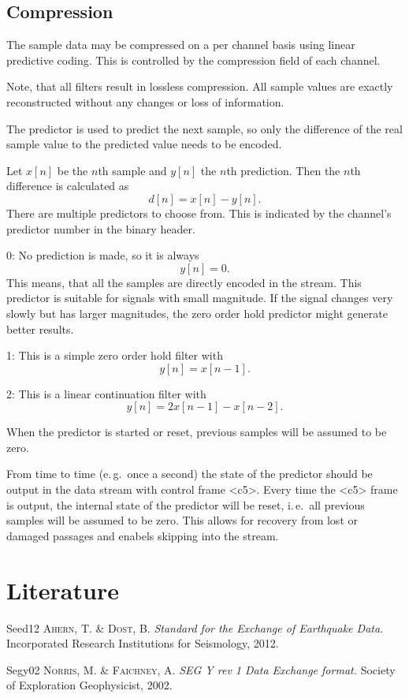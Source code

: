 \documentclass[DIV=10]{scrartcl}
\newcommand\litref[1]{\textref{[#1]}}
\newenvironment{refliterature}
{\list{}{
  \setlength{\leftmargin}{45pt}
  \setlength{\labelwidth}{45pt}
  \setlength{\labelsep}{0pt}
  \setlength{\itemindent}{0pt}
  \setlength{\itemsep}{-2pt}
  \let\makelabel\litref
}\RaggedRight}
{\endlist}
\begin{document}
\subsection{Compression}
\label{compression}

The sample data may be compressed on a per channel basis using linear predictive coding.
This is controlled by the compression field of each channel.

Note, that all filters result in lossless compression.
All sample values are exactly reconstructed without any changes or loss of information.

The predictor is used to predict the next sample, so only the difference of the real sample value to the predicted value needs to be encoded.

Let \(x[n]\) be the \(n\)th sample and \(y[n]\) the \(n\)th prediction.
Then the \(n\)th difference is calculated as
\[
  d[n] = x[n] - y[n].
\]
There are multiple predictors to choose from.
This is indicated by the channel’s predictor number in the binary header.

0: No prediction is made, so it is always
\[
  y[n] = 0.
\]
This means, that all the samples are directly encoded in the stream.
This predictor is suitable for signals with small magnitude.
If the signal changes very slowly but has larger magnitudes, the zero order hold predictor might generate better results.

1: This is a simple zero order hold filter with
\[
  y[n] = x[n - 1].
\]

2: This is a linear continuation filter with
\[
  y[n] = 2x[n - 1] - x[n - 2].
\]

When the predictor is started or reset, previous samples will be assumed to be zero.

From time to time (e.\,g.\ once a second) the state of the predictor should be output in the data stream with control frame <c5>.
Every time the <c5> frame is output, the internal state of the predictor will be reset, i.\,e.\ all previous samples will be assumed to be zero.
This allows for recovery from lost or damaged passages and enabels skipping into the stream.

\section{Literature}

\begin{refliterature}
\item[Seed12] \textsc{Ahern, T. \& Dost, B.} \textit{Standard for the Exchange of Earthquake Data.} Incorporated Research Institutions for Seismology, 2012.
\item[Segy02] \textsc{Norris, M. \& Faichney, A.} \textit{SEG Y rev 1 Data Exchange format.} Society of Exploration Geophysicist, 2002.
\end{refliterature}
\end{document}
